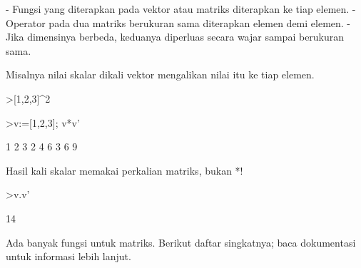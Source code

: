 \documentclass[a4paper,10pt]{article}
\begin{document}
\begin{eulernotebook}
\begin{eulercomment}
\begin{eulercomment}
\begin{eulercomment}
\begin{eulercomment}
\begin{eulercomment}
\begin{eulercomment}
\begin{eulercomment}
\begin{eulercomment}
\begin{eulercomment}
\begin{eulercomment}
\begin{eulercomment}
\begin{eulercomment}
\begin{eulercomment}
\begin{eulercomment}
\begin{eulercomment}
\begin{eulercomment}
\begin{eulercomment}
- Fungsi yang diterapkan pada vektor atau matriks diterapkan ke tiap elemen.
- Operator pada dua matriks berukuran sama diterapkan elemen demi elemen.
- Jika dimensinya berbeda, keduanya diperluas secara wajar sampai berukuran sama.

Misalnya nilai skalar dikali vektor mengalikan nilai itu ke tiap elemen.
\end{eulercomment}
\begin{eulerprompt}
>[1,2,3]^2
\end{eulerprompt}
\begin{euleroutput}
  [1,  4,  9]
\end{euleroutput}
\begin{eulerprompt}
>v:=[1,2,3]; v*v'
\end{eulerprompt}
\begin{euleroutput}
              1             2             3 
              2             4             6 
              3             6             9 
\end{euleroutput}
\begin{eulercomment}
Hasil kali skalar memakai perkalian matriks, bukan *!
\end{eulercomment}
\begin{eulerprompt}
>v.v'
\end{eulerprompt}
\begin{euleroutput}
  14
\end{euleroutput}
\begin{eulercomment}
Ada banyak fungsi untuk matriks. Berikut daftar singkatnya; baca dokumentasi
untuk informasi lebih lanjut.


\end{eulercomment}
\end{eulercomment}
\end{eulercomment}
\end{eulercomment}
\end{eulercomment}
\end{eulercomment}
\end{eulercomment}
\end{eulercomment}
\end{eulercomment}
\end{eulercomment}
\end{eulercomment}
\end{eulercomment}
\end{eulercomment}
\end{eulercomment}
\end{eulercomment}
\end{eulercomment}
\end{eulercomment}
\end{eulernotebook}
\end{document}
